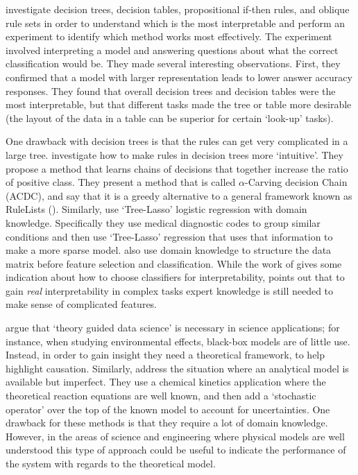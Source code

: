     \citet{Huysmans2011-th} investigate decision trees, decision tables, propositional if-then rules, and oblique rule sets in order to understand which is the most interpretable and perform an experiment to identify which method works most effectively. The experiment involved interpreting a model and answering questions about what the correct classification would be. They made several interesting observations. First, they confirmed that a model with larger representation leads to lower answer accuracy responses. They found that overall decision trees and decision tables were the most interpretable, but that different tasks made the tree or table more desirable (the layout of the data in a table can be superior for certain `look-up' tasks). 

    One drawback with decision trees is that the rules can get very complicated in a large tree. \citet{Park2016-ld} investigate how to make rules in decision trees more `intuitive'. They propose a method that learns chains of decisions that together increase the ratio of positive class. They present a method that is called $\alpha$-Carving decision Chain (ACDC), and say that it is a greedy alternative to a general framework known as RuleLists (\citet{Wang2015-ww}). Similarly, \citet{Jovanovic2016-gw} use `Tree-Lasso' logistic regression with domain knowledge. Specifically they use medical diagnostic codes to group similar conditions and then use `Tree-Lasso' regression that uses that information to make a more sparse model. \citet{Zycinski2012-jj} also use domain knowledge to structure the data matrix before feature selection and classification. While the work of \citeauthor{Huysmans2011-th} gives some indication about how to choose classifiers for interpretability, \citeauthor{Park2016-ld} points out that to gain \emph{real} interpretability in complex tasks expert knowledge is still needed to make sense of complicated features.

    \citet{Faghmous2014-og} argue that `theory guided data science' is necessary in science applications; for instance, when studying environmental effects, black-box models are of little use. Instead, in order to gain insight they need a theoretical framework, to help highlight causation. Similarly, \citet{Morrison2016-fz} address the situation where an analytical model is available but imperfect. They use a chemical kinetics application where the theoretical reaction equations are well known, and then add a `stochastic operator' over the top of the known model to account for uncertainties. One drawback for these methods is that they require a lot of domain knowledge. However, in the areas of science and engineering where physical models are well understood this type of approach could be useful to indicate the performance of the system with regards to the theoretical model.

